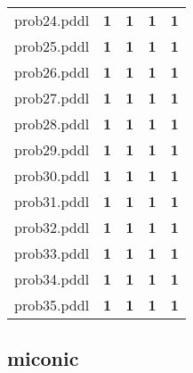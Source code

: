 \documentclass{article}
\begin{document}
\begin{tabular}{@{}lrrrr@{}}
prob24.pddl & \textbf{1} & \textbf{1} & \textbf{1} & \textbf{1} \\
prob25.pddl & \textbf{1} & \textbf{1} & \textbf{1} & \textbf{1} \\
prob26.pddl & \textbf{1} & \textbf{1} & \textbf{1} & \textbf{1} \\
prob27.pddl & \textbf{1} & \textbf{1} & \textbf{1} & \textbf{1} \\
prob28.pddl & \textbf{1} & \textbf{1} & \textbf{1} & \textbf{1} \\
prob29.pddl & \textbf{1} & \textbf{1} & \textbf{1} & \textbf{1} \\
prob30.pddl & \textbf{1} & \textbf{1} & \textbf{1} & \textbf{1} \\
prob31.pddl & \textbf{1} & \textbf{1} & \textbf{1} & \textbf{1} \\
prob32.pddl & \textbf{1} & \textbf{1} & \textbf{1} & \textbf{1} \\
prob33.pddl & \textbf{1} & \textbf{1} & \textbf{1} & \textbf{1} \\
prob34.pddl & \textbf{1} & \textbf{1} & \textbf{1} & \textbf{1} \\
prob35.pddl & \textbf{1} & \textbf{1} & \textbf{1} & \textbf{1} \\
\end{tabular}

\hypertarget{coverage-miconic}{}
\subsection*{miconic}
\end{document}
